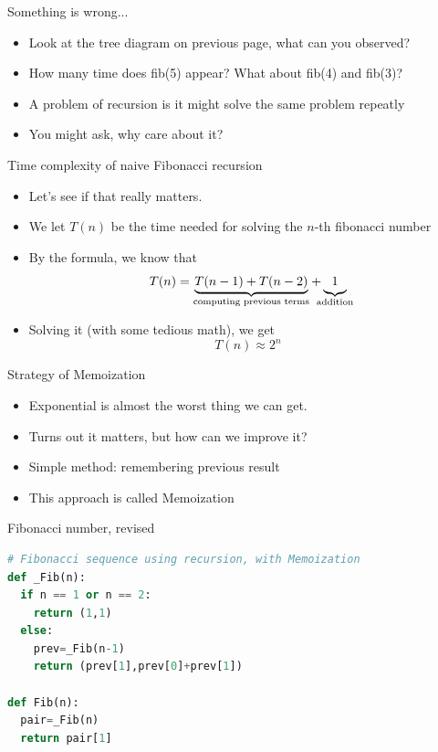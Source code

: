 \documentclass[10pt,xcolor={table,dvipsnames},t]{beamer}
\begin{document}
\begin{frame}{Something is wrong...}
  \begin{itemize}
  \item Look at the tree diagram on previous page, what can you observed?
  \item How many time does fib(5) appear? What about fib(4) and fib(3)?
  \item A problem of recursion is it might solve the same problem repeatly
  \item You might ask, why care about it?
  \end{itemize}
\end{frame}

\begin{frame}{Time complexity of naive Fibonacci recursion}
  \begin{itemize}
    \item Let's see if that really matters.
    \item We let $T(n)$ be the time needed for solving the $n$-th fibonacci number
    \item By the formula, we know that $$T(n)=\underbrace{T(n-1)+T(n-2)}_{\text{computing previous terms}}+\underbrace{\vphantom{T(n-1)+T(n-2)}1}_{\mathclap{\text{addition}}}$$
    \item Solving it (with some tedious math), we get $$T(n)\approx 2^{n}$$
  \end{itemize}
\end{frame}

\begin{frame}{Strategy of Memoization}
  \begin{itemize}
    \item Exponential is almost the worst thing we can get.
    \item Turns out it matters, but how can we improve it?
    \item Simple method: remembering previous result
    \item This approach is called Memoization
  \end{itemize}
\end{frame}

\begin{frame}[fragile]{Fibonacci number, revised}
\begin{lstlisting}[language=python]
# Fibonacci sequence using recursion, with Memoization
def _Fib(n):
  if n == 1 or n == 2:
    return (1,1)
  else:
    prev=_Fib(n-1)
    return (prev[1],prev[0]+prev[1])

def Fib(n):
  pair=_Fib(n)
  return pair[1]
\end{lstlisting}
\end{frame}
\end{document}
